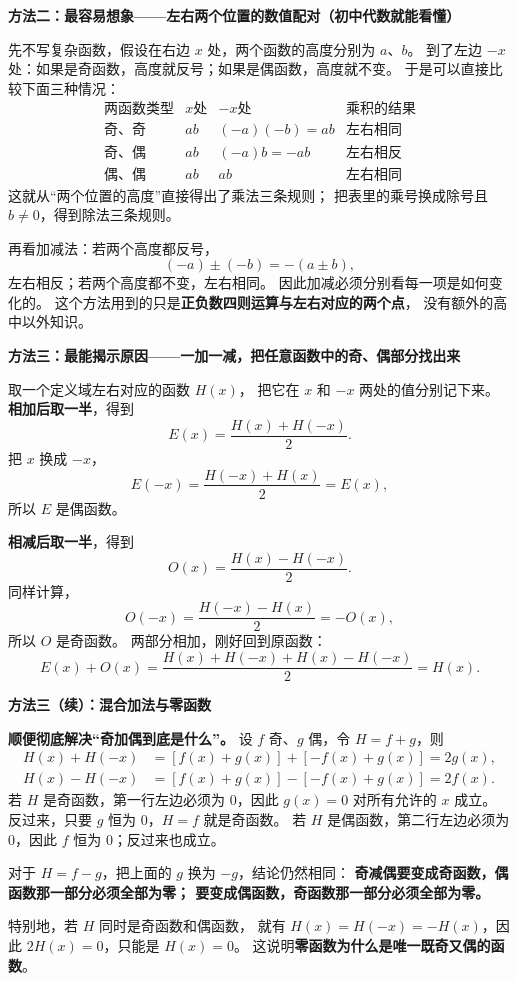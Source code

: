 \clearpage
\begin{proofbox}
\textbf{\textcolor{CProof}{方法二：最容易想象——左右两个位置的数值配对（初中代数就能看懂）}}



先不写复杂函数，假设在右边 $x$ 处，两个函数的高度分别为 $a$、$b$。
到了左边 $-x$ 处：如果是奇函数，高度就反号；如果是偶函数，高度就不变。
于是可以直接比较下面三种情况：
\[
\begin{array}{c|c|c|c}
\text{两函数类型}&x\text{处}&-x\text{处}&\text{乘积的结果}\\ \hline
\text{奇、奇}&ab&(-a)(-b)=ab&\text{左右相同}\\
\text{奇、偶}&ab&(-a)b=-ab&\text{左右相反}\\
\text{偶、偶}&ab&ab&\text{左右相同}
\end{array}
\]
这就从“两个位置的高度”直接得出了乘法三条规则；
把表里的乘号换成除号且 $b\ne0$，得到除法三条规则。

再看加减法：若两个高度都反号，
\[
(-a)\pm(-b)=-(a\pm b),
\]
左右相反；若两个高度都不变，左右相同。
因此加减必须分别看每一项是如何变化的。
这个方法用到的只是\textbf{正负数四则运算与左右对应的两个点}，
没有额外的高中以外知识。

\medskip

\end{proofbox}
\clearpage
\begin{proofbox}
\textbf{\textcolor{CProof}{方法三：最能揭示原因——一加一减，把任意函数中的奇、偶部分找出来}}



取一个定义域左右对应的函数 $H(x)$，
把它在 $x$ 和 $-x$ 两处的值分别记下来。
\textbf{相加后取一半}，得到
\[
E(x)=\frac{H(x)+H(-x)}2.
\]
把 $x$ 换成 $-x$，
\[
E(-x)=\frac{H(-x)+H(x)}2=E(x),
\]
所以 $E$ 是偶函数。

\textbf{相减后取一半}，得到
\[
O(x)=\frac{H(x)-H(-x)}2.
\]
同样计算，
\[
O(-x)=\frac{H(-x)-H(x)}2=-O(x),
\]
所以 $O$ 是奇函数。
两部分相加，刚好回到原函数：
\[
E(x)+O(x)
=\frac{H(x)+H(-x)+H(x)-H(-x)}2=H(x).
\]

\end{proofbox}\clearpage\begin{proofbox}\textbf{方法三（续）：混合加法与零函数}

\textbf{顺便彻底解决“奇加偶到底是什么”。}
设 $f$ 奇、$g$ 偶，令 $H=f+g$，则
\[
\begin{aligned}
H(x)+H(-x)&=[f(x)+g(x)]+[-f(x)+g(x)]=2g(x),\\
H(x)-H(-x)&=[f(x)+g(x)]-[-f(x)+g(x)]=2f(x).
\end{aligned}
\]
若 $H$ 是奇函数，第一行左边必须为 $0$，因此 $g(x)=0$ 对所有允许的 $x$ 成立。
反过来，只要 $g$ 恒为 $0$，$H=f$ 就是奇函数。
若 $H$ 是偶函数，第二行左边必须为 $0$，因此 $f$ 恒为 $0$；反过来也成立。

对于 $H=f-g$，把上面的 $g$ 换为 $-g$，结论仍然相同：
\textbf{奇减偶要变成奇函数，偶函数那一部分必须全部为零；
要变成偶函数，奇函数那一部分必须全部为零。}

特别地，若 $H$ 同时是奇函数和偶函数，
就有 $H(x)=H(-x)=-H(x)$，因此 $2H(x)=0$，只能是 $H(x)=0$。
这说明\textbf{零函数为什么是唯一既奇又偶的函数}。
\end{proofbox}
